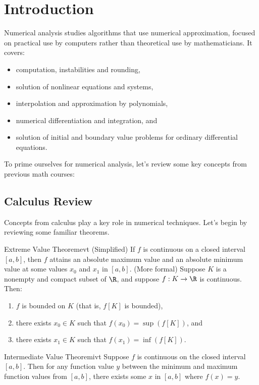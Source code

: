 \chapter{Introduction}
Numerical analysis studies algorithms that use numerical approximation, focused on practical use by computers rather than theoretical use by mathematicians. It covers:
\begin{itemize}[noitemsep]
    \item computation, instabilities and rounding,
    \item solution of nonlinear equations and systems,
    \item interpolation and approximation by polynomials,
    \item numerical differentiation and integration, and
    \item solution of initial and boundary value problems for ordinary differential equations.
\end{itemize}
To prime ourselves for numerical analysis, let's review some key concepts from previous math courses:

\section{Calculus Review}
Concepts from calculus play a key role in numerical techniques. Let's begin by reviewing some familiar theorems.

\begin{thmbox}{Extreme Value Theorem}{evt}
    (Simplified) If $f$ is continuous on a closed interval $[a, b]$, then $f$ attains an absolute maximum value and an absolute minimum value at some values $x_0$ and $x_1$ in $[a,b]$.
    \tcblower
    (More formal) Suppose $K$ is a nonempty and compact subset of $\R$, and suppose $f : K \to \R$ is continuous. Then:
    \begin{enumerate}[label=(\alph*)]
        \item $f$ is bounded on $K$ (that is, $f[K]$ is bounded),
        \item there exists $x_0 \in K$ such that $f(x_0) = \sup( f[K] )$, and
        \item there exists $x_1 \in K$ such that $f(x_1) = \inf( f[K] )$.
    \end{enumerate}
\end{thmbox}

\begin{thmbox}{Intermediate Value Theorem}{ivt}
    Suppose $f$ is continuous on the closed interval $[a,b]$. Then for any function value $y$ between the minimum and maximum function values from $[a,b]$, there exists some $x$ in $[a,b]$ where $f(x) = y$.
\end{thmbox}

